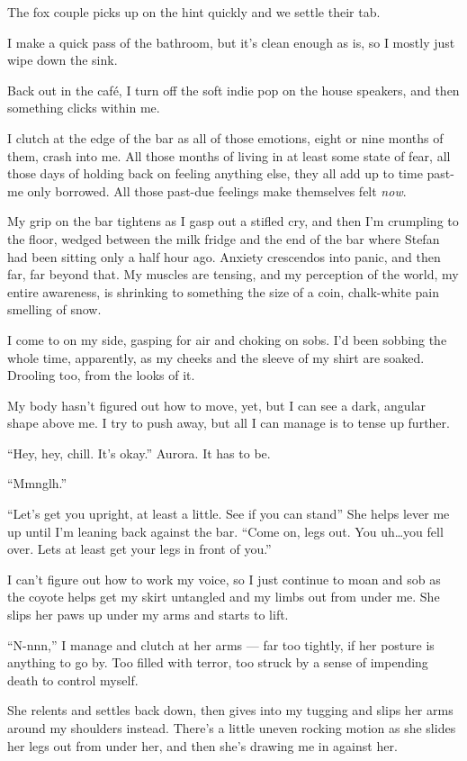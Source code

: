 The fox couple picks up on the hint quickly and we settle their tab.

I make a quick pass of the bathroom, but it's clean enough as is, so I mostly just wipe down the sink.

Back out in the café, I turn off the soft indie pop on the house speakers, and then something clicks within me.

I clutch at the edge of the bar as all of those emotions, eight or nine months of them, crash into me. All those months of living in at least some state of fear, all those days of holding back on feeling anything else, they all add up to time past-me only borrowed. All those past-due feelings make themselves felt \emph{now}.

My grip on the bar tightens as I gasp out a stifled cry, and then I'm crumpling to the floor, wedged between the milk fridge and the end of the bar where Stefan had been sitting only a half hour ago. Anxiety crescendos into panic, and then far, far beyond that. My muscles are tensing, and my perception of the world, my entire awareness, is shrinking to something the size of a coin, chalk-white pain smelling of snow.

I come to on my side, gasping for air and choking on sobs. I'd been sobbing the whole time, apparently, as my cheeks and the sleeve of my shirt are soaked. Drooling too, from the looks of it.

My body hasn't figured out how to move, yet, but I can see a dark, angular shape above me. I try to push away, but all I can manage is to tense up further.

``Hey, hey, chill. It's okay.'' Aurora. It has to be.

``Mmnglh.''

``Let's get you upright, at least a little. See if you can stand'' She helps lever me up until I'm leaning back against the bar. ``Come on, legs out. You uh\ldots{}you fell over. Lets at least get your legs in front of you.''

I can't figure out how to work my voice, so I just continue to moan and sob as the coyote helps get my skirt untangled and my limbs out from under me. She slips her paws up under my arms and starts to lift.

``N-nnn,'' I manage and clutch at her arms --- far too tightly, if her posture is anything to go by. Too filled with terror, too struck by a sense of impending death to control myself.

She relents and settles back down, then gives into my tugging and slips her arms around my shoulders instead. There's a little uneven rocking motion as she slides her legs out from under her, and then she's drawing me in against her.

